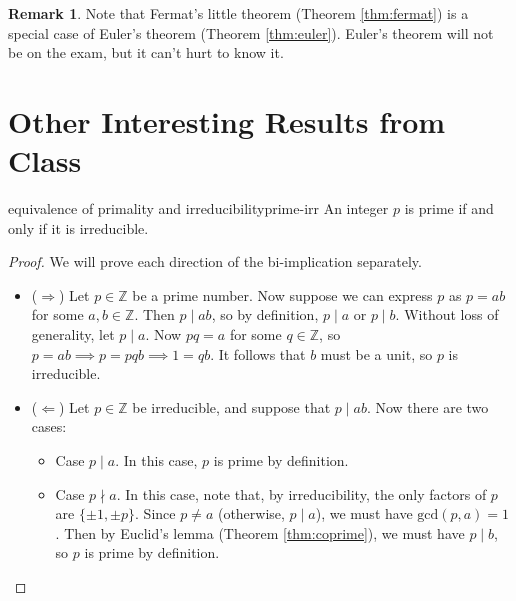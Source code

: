 \documentclass{article}
\theoremstyle{definition}
\newtheorem*{remark}{Remark}
\def\gcd{\textrm{gcd}}
\def\divides{\mid}
\begin{document}
\begin{remark}
  Note that Fermat's little theorem (Theorem \ref{thm:fermat}) is a special case
  of Euler's theorem (Theorem \ref{thm:euler}). Euler's theorem will not be on
  the exam, but it can't hurt to know it.
\end{remark}

\section{Other Interesting Results from Class}
\begin{theorem}{equivalence of primality and irreducibility}{prime-irr}
  An integer $p$ is prime if and only if it is irreducible.
\end{theorem}
\begin{proof}
  We will prove each direction of the bi-implication separately.
  \begin{itemize}
    \item ($\Longrightarrow$) Let $p \in \mathbb{Z}$ be a prime number. Now
      suppose we can express $p$ as $p = ab$ for some $a,b \in \mathbb{Z}$. Then
      $p \divides ab$, so by definition, $p \divides a$ or $p \divides b$.
      Without loss of generality, let $p \divides a$. Now $pq = a$ for some
      $q \in \mathbb{Z}$, so $p = ab \implies p = pqb \implies 1 = qb$. It
      follows that $b$ must be a unit, so $p$ is irreducible.
    \item ($\Longleftarrow$) Let $p \in \mathbb{Z}$ be irreducible, and suppose
      that $p \divides ab$. Now there are two cases:
      \begin{itemize}
        \item Case $p \divides a$. In this case, $p$ is prime by definition.
        \item Case $p \nmid a$. In this case, note that, by irreducibility, the
          only factors of $p$ are $\{\pm 1, \pm p\}$. Since $p \neq a$
          (otherwise, $p \divides a$), we must have $\gcd(p,a)=1$. Then by
          Euclid's lemma (Theorem \ref{thm:coprime}), we must have
          $p \divides b$, so $p$ is prime by definition.
      \end{itemize}
  \end{itemize}
\end{proof}
\end{document}

